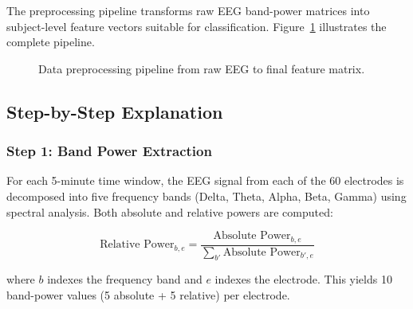 \documentclass[12pt,a4paper]{article}
\begin{document}
The preprocessing pipeline transforms raw EEG band-power matrices into subject-level feature vectors suitable for classification. Figure~\ref{fig:preprocess_pipeline} illustrates the complete pipeline.

\begin{figure}[H]
\centering
{}
\caption{Data preprocessing pipeline from raw EEG to final feature matrix.}
\label{fig:preprocess_pipeline}
\end{figure}

\subsection{Step-by-Step Explanation}

\subsubsection{Step 1: Band Power Extraction}

For each 5-minute time window, the EEG signal from each of the 60 electrodes is decomposed into five frequency bands (Delta, Theta, Alpha, Beta, Gamma) using spectral analysis. Both absolute and relative powers are computed:

\begin{equation}
\text{Relative Power}_{b,e} = \frac{\text{Absolute Power}_{b,e}}{\sum_{b'} \text{Absolute Power}_{b',e}}
\end{equation}

where $b$ indexes the frequency band and $e$ indexes the electrode. This yields 10 band-power values (5 absolute + 5 relative) per electrode.
\end{document}
